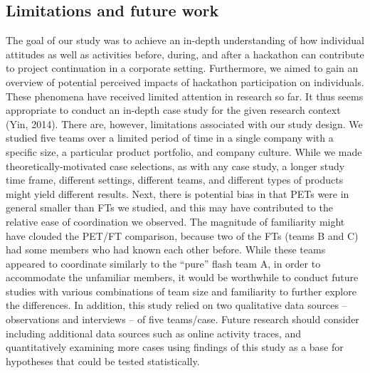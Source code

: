 \documentclass{hcij}
\begin{document}
\subsection{Limitations and future work}
The goal of our study was to achieve an in-depth understanding of how individual attitudes as well as activities before, during, and after a hackathon can contribute to project continuation in a corporate setting. Furthermore, we aimed to gain an overview of potential perceived impacts of hackathon participation on individuals. These phenomena have received limited attention in research so far. It thus seems appropriate to conduct an in-depth case study for the given research context (Yin, 2014). There are, however, limitations associated with our study design. We studied five teams over a limited period of time in a single company with a specific size, a particular product portfolio, and company culture. While we made theoretically-motivated case selections, as with any case study, a longer study time frame, different settings, different teams, and different types of products might yield different results. Next, there is potential bias in that PETs were in general smaller than FTs we studied, and this may have contributed to the relative ease of coordination we observed. The magnitude of familiarity might have clouded the PET/FT comparison, because two of the FTs (teams B and C) had some members who had known each other before. While these teams appeared to coordinate similarly to the “pure” flash team A, in order to accommodate the unfamiliar members, it would be worthwhile to conduct future studies with various combinations of team size and familiarity to further explore the differences. In addition, this study relied on two qualitative data sources –observations and interviews – of five teams/case. Future research should consider including additional data sources such as online activity traces, and quantitatively examining more cases using findings of this study as a base for hypotheses that could be tested statistically.
\end{document}

